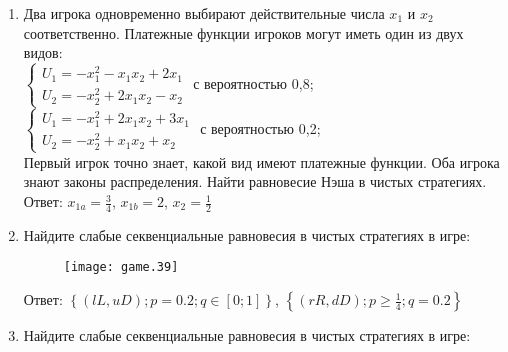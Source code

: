 \documentclass[pdftex,12pt,a4paper]{article}
\begin{document}
\begin{enumerate}
\item Два игрока одновременно выбирают действительные числа $x_{1}$ и $x_{2}$  соответственно. Платежные функции игроков могут иметь один из двух видов: \\
$\left\{
\begin{array}{c}
U_{1}=-x_{1}^{2}-x_{1}x_{2}+2x_{1} \\
U_{2}=-x_{2}^{2}+2x_{1}x_{2}-x_{2}
\end{array}\right.$ с вероятностью 0,8;\\
$\left\{
\begin{array}{c}
U_{1}=-x_{1}^{2}+2x_{1}x_{2}+3x_{1} \\
U_{2}=-x_{2}^{2}+x_{1}x_{2}+x_{2}
\end{array}\right.$ с вероятностью 0,2;\\
Первый игрок точно знает, какой вид имеют платежные функции. Оба игрока знают законы распределения. Найти равновесие Нэша в чистых стратегиях.\\
Ответ: $x_{1a}=\frac{3}{4}$, $x_{1b}=2$, $x_{2}=\frac{1}{2}$ 

\item Найдите слабые секвенциальные равновесия в чистых стратегиях в игре: \\

\begin{figure}[htbp]
    \texttt{[image: game.39]}
\end{figure}
Ответ: $\left\{(lL,uD); p=0.2; q\in [0;1]\right\}$, $\left\{(rR,dD);p\ge \frac{1}{4} ;q=0.2\right\}$

\item Найдите слабые секвенциальные равновесия в чистых стратегиях в игре: \\




\end{enumerate}
\end{document}
